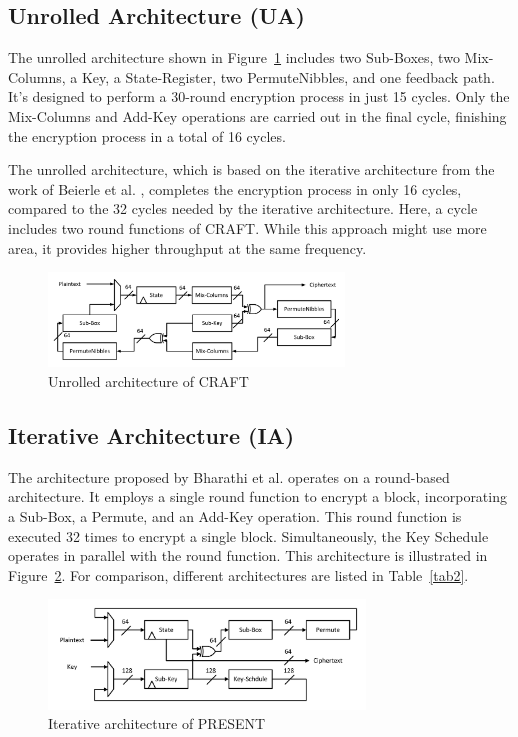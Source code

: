 \documentclass[final,5p,times,twocolumn]{elsarticle}
\begin{document}
\subsection{Unrolled Architecture (UA)}\label{subsec3}

The unrolled architecture shown in Figure~\ref{fig4} includes two Sub-Boxes, two Mix-Columns, a Key, a State-Register, two PermuteNibbles, and one feedback path. It's designed to perform a 30-round encryption process in just 15 cycles. Only the Mix-Columns and Add-Key operations are carried out in the final cycle, finishing the encryption process in a total of 16 cycles.

The unrolled architecture, which is based on the iterative architecture from the work of Beierle et al. \cite{Beierle2019}, completes the encryption process in only 16 cycles, compared to the 32 cycles needed by the iterative architecture. Here, a cycle includes two round functions of CRAFT. While this approach might use more area, it provides higher throughput at the same frequency.


\begin{figure}[h]%
    \centering
    \includegraphics[width=0.7\textwidth]{./fig/unrolled-archticture.pdf}
    \caption{Unrolled architecture of CRAFT}\label{fig4}
\end{figure}

\subsection{Iterative Architecture (IA)}\label{iterative_architecture}

The architecture proposed by Bharathi et al. \cite{Bharathi2022} operates on a round-based architecture.
It employs a single round function to encrypt a block, incorporating a Sub-Box, a Permute, and an Add-Key operation.
This round function is executed 32 times to encrypt a single block. Simultaneously, the Key Schedule operates in parallel with the round function. This architecture is illustrated in Figure~\ref{fig5}.
For comparison, different architectures are listed in Table~\ref{tab2}.

\begin{figure}
    \centering
    \includegraphics[width=0.75\textwidth]{./fig/iteration-present.pdf}
    \caption{Iterative architecture of PRESENT}\label{fig5}
\end{figure}
\end{document}

